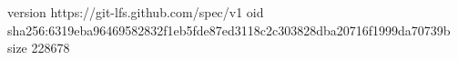 version https://git-lfs.github.com/spec/v1
oid sha256:6319eba96469582832f1eb5fde87ed3118c2c303828dba20716f1999da70739b
size 228678
